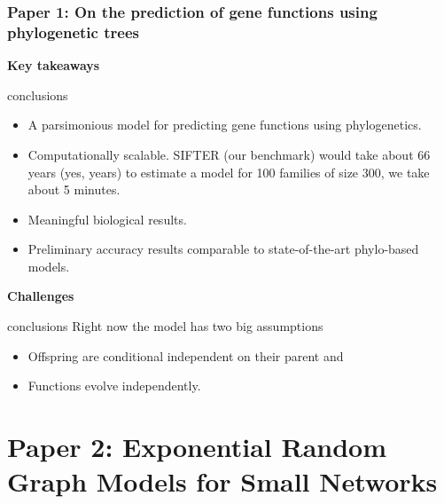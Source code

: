 \documentclass[aspectratio=169, 9pt]{beamer}\usepackage[]{graphicx}\usepackage[]{color}
\begin{document}
\begin{frame}[t]
\frametitle{Paper 1: On the prediction of gene functions using phylogenetic trees}

{\bf \large Key takeaways}
\begin{beamercolorbox}[dp=1ex]{conclusions}
\begin{itemize}
\item A parsimonious model for predicting gene functions using phylogenetics.
\item Computationally scalable. SIFTER (our benchmark)
would take about 66 years (yes, years) to estimate a model for 100 families
of size 300, we take about 5 minutes.
\item Meaningful biological results.
\item Preliminary accuracy results comparable to state-of-the-art phylo-based models.
\end{itemize}
\end{beamercolorbox}\pause

{\bf \large Challenges}
\begin{beamercolorbox}[dp=1ex]{conclusions}
Right now the model has two big assumptions\pause{}
\begin{itemize}
\item Offspring are conditional independent on their parent and\pause{}
\item Functions evolve independently. \hyperlink{duplicationvsspeciation}{}
\end{itemize}
\end{beamercolorbox}

\end{frame}



\section{Paper 2: Exponential Random Graph Models for Small Networks}

\end{document}
